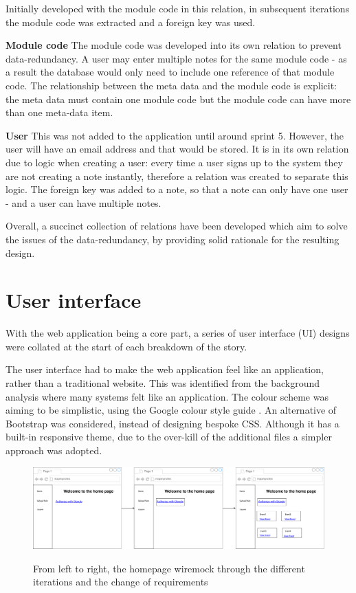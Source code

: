 Initially developed with the module code in this relation, in subsequent iterations the module code was extracted and a foreign key was used.

\noindent
\textbf{Module code}
\newline
The module code was developed into its own relation to prevent data-redundancy. A user may enter multiple notes for the same module code - as a result the database would only need to include one reference of that module code. The relationship between the meta data and the module code is explicit: the meta data must contain one module code but the module code can have more than one meta-data item.

\noindent
\textbf{User}
\newline
This was not added to the application until around sprint 5. However, the user will have an email address and that would be stored. It is in its own relation due to logic when creating a user: every time a user signs up to the system they are not creating a note instantly, therefore a relation was created to separate this logic. The foreign key was added to a note, so that a note can only have one user - and a user can have multiple notes.


\noindent
Overall, a succinct collection of relations have been developed which aim to solve the issues of the data-redundancy, by providing solid rationale for the resulting design.


\section{User interface}
With the web application being a core part, a series of user interface (UI) designs were collated at the start of each breakdown of the story.

The user interface had to make the web application feel like an application, rather than a traditional website. This was identified from the background analysis where many systems felt like an application. The colour scheme was aiming to be simplistic, using the Google colour style guide \cite{citeulike:14023831}. An alternative of Bootstrap \cite{citeulike:13995818} was considered, instead of designing bespoke CSS. Although it has a built-in responsive theme, due to the over-kill of the additional files a simpler approach was adopted.

\begin{figure}[H]
  \centering
  \includegraphics[scale=0.22]{images/homepage_wiremock.pdf}
  \label{fig:homepage_wiremock}
  \caption{From left to right, the homepage wiremock through the different iterations and the change of requirements}
\end{figure}

